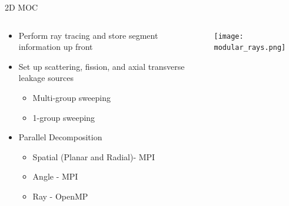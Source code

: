 \begin{frame}[t]{2D MOC}
  
  \begin{columns}
    \begin{column}{0.55\textwidth}
      \begin{itemize}
        \item Perform ray tracing and store segment information up front
        \item Set up scattering, fission, and axial transverse leakage sources
        \begin{itemize}
            \item Multi-group sweeping
          \item 1-group sweeping
        \end{itemize}
        \item Parallel Decomposition
        \begin{itemize}
          \item Spatial (Planar and Radial)- MPI
          \item Angle - MPI
          \item Ray - OpenMP
        \end{itemize}
      \end{itemize}
    \end{column}
    \begin{column}{0.45\textwidth}
      \texttt{[image: modular\_rays.png]}
    \end{column}
  \end{columns}

\end{frame}